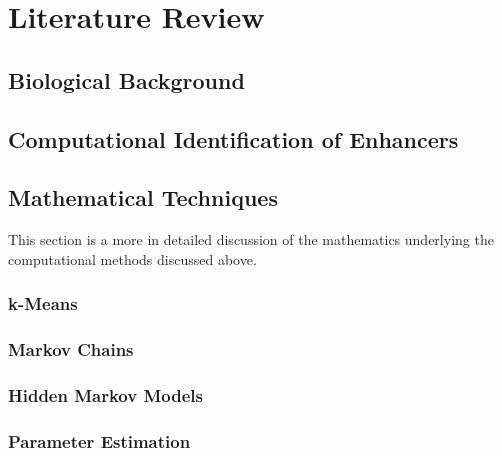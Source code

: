 \documentclass[12pt,a4paper]{article}
\author{D Maderazo}
\begin{document}
    

    \section{Literature Review}
        \subsection{Biological Background}
        
        \subsection{Computational Identification of Enhancers}
         
        \subsection{Mathematical Techniques}

        This section is a more in detailed discussion of the mathematics underlying the computational methods discussed above.

            \subsubsection{k-Means}
            
            

            \subsubsection{Markov Chains}
            
            
            \subsubsection{Hidden Markov Models}
             
            
            \subsubsection{Parameter Estimation}
            
            
\end{document}
